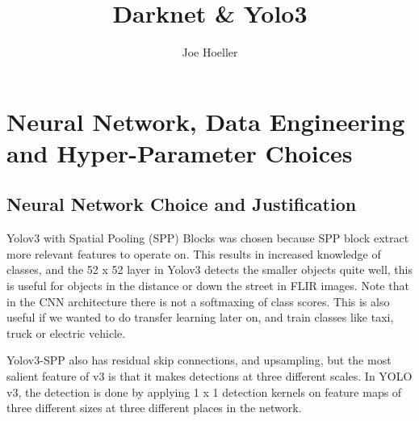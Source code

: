 \documentclass[oneside]{article}
\begin{document}
\title{Darknet \& Yolo3}
\author{Joe Hoeller
}
\maketitle

\begin{abstract}



\end{abstract}



\section{Neural Network, Data Engineering and Hyper-Parameter Choices}
\subsection{Neural Network Choice and Justification}
Yolov3 with Spatial Pooling (SPP) Blocks was chosen because SPP block extract more relevant features to operate on. This results in increased knowledge of classes, and the 52 x 52 layer in Yolov3 detects the smaller objects quite well, this is useful for objects in the distance or down the street in FLIR images. Note that in the CNN architecture there is not a softmaxing of class scores. This is also useful if we wanted to do transfer learning later on, and train classes like taxi, truck or electric vehicle.

Yolov3-SPP also has residual skip connections, and upsampling, but the most salient feature of v3 is that it makes detections at three different scales. In YOLO v3, the detection is done by applying 1 x 1 detection kernels on feature maps of three different sizes at three different places in the network.
\end{document}
